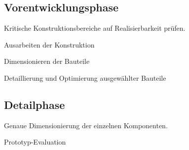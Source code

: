 	\subsection{Vorentwicklungsphase} %
		Kritische Konstruktionsbereiche auf Realisierbarkeit prüfen.
		\begin{tightitemize}
			\item Ausarbeiten der Konstruktion
			\item Dimensionieren der Bauteile
			\item Detaillierung und Optimierung ausgewählter Bauteile
		\end{tightitemize}
	\subsection{Detailphase} %
		\begin{tightitemize}
			\item Genaue Dimensionierung der einzelnen Komponenten.
			\item Prototyp-Evaluation
		\end{tightitemize}
